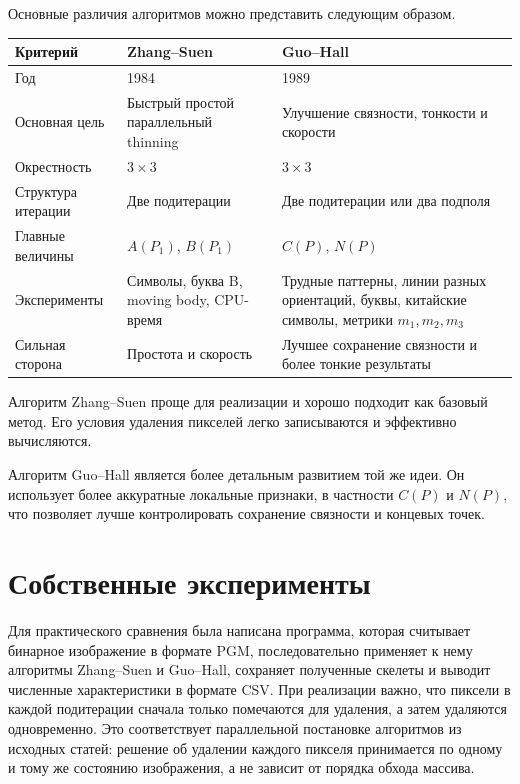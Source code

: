 \documentclass[12pt,a4paper]{article}
\begin{document}
	Основные различия алгоритмов можно представить следующим образом.
	
	\begin{center}
		\begin{tabular}{p{45mm}p{45mm}p{45mm}}
			\toprule
			Критерий & Zhang--Suen & Guo--Hall \\
			\midrule
			Год & 1984 & 1989 \\
			Основная цель & Быстрый простой параллельный thinning & Улучшение связности, тонкости и скорости \\
			Окрестность & $3\times3$ & $3\times3$ \\
			Структура итерации & Две подитерации & Две подитерации или два подполя \\
			Главные величины & $A(P_1)$, $B(P_1)$ & $C(P)$, $N(P)$ \\
			Эксперименты & Символы, буква B, moving body, CPU-время & Трудные паттерны, линии разных ориентаций, буквы, китайские символы, метрики $m_1,m_2,m_3$ \\
			Сильная сторона & Простота и скорость & Лучшее сохранение связности и более тонкие результаты \\
			\bottomrule
		\end{tabular}
	\end{center}
	
	Алгоритм Zhang--Suen проще для реализации и хорошо подходит как базовый метод. Его условия удаления пикселей легко записываются и эффективно вычисляются.
	
	Алгоритм Guo--Hall является более детальным развитием той же идеи. Он использует более аккуратные локальные признаки, в частности $C(P)$ и $N(P)$, что позволяет лучше контролировать сохранение связности и концевых точек.
	
	
	\section{Собственные эксперименты}
	
	Для практического сравнения была написана программа, которая считывает бинарное изображение в формате PGM, последовательно применяет к нему алгоритмы Zhang--Suen и Guo--Hall, сохраняет полученные скелеты и выводит численные характеристики в формате CSV. При реализации важно, что пиксели в каждой подитерации сначала только помечаются для удаления, а затем удаляются одновременно. Это соответствует параллельной постановке алгоритмов из исходных статей: решение об удалении каждого пикселя принимается по одному и тому же состоянию изображения, а не зависит от порядка обхода массива.
	
\end{document}
